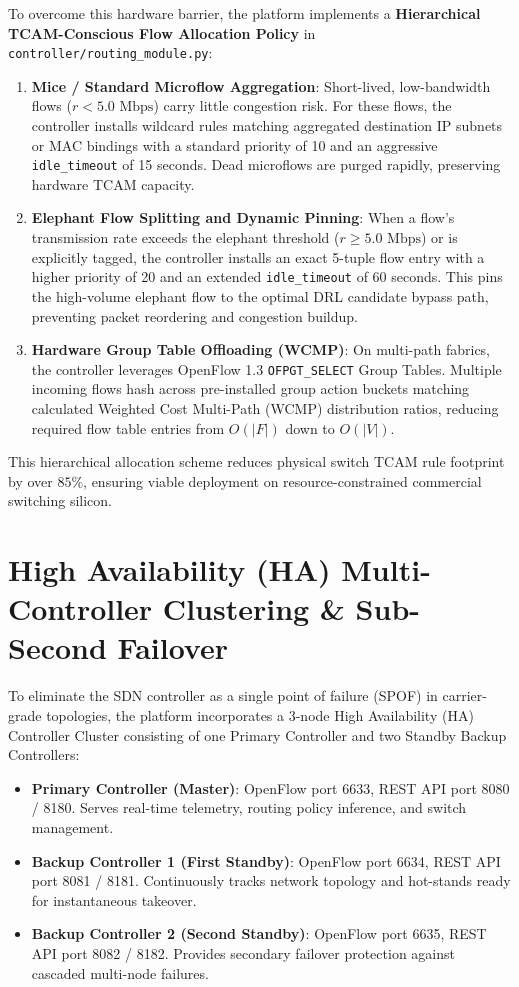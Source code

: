 \documentclass[12pt,a4paper,oneside]{report}
\begin{document}
To overcome this hardware barrier, the platform implements a \textbf{Hierarchical TCAM-Conscious Flow Allocation Policy} in \texttt{controller/routing\_module.py}:
\begin{enumerate}
    \item \textbf{Mice / Standard Microflow Aggregation}: Short-lived, low-bandwidth flows ($r < 5.0\text{ Mbps}$) carry little congestion risk. For these flows, the controller installs wildcard rules matching aggregated destination IP subnets or MAC bindings with a standard priority of 10 and an aggressive \texttt{idle\_timeout} of 15 seconds. Dead microflows are purged rapidly, preserving hardware TCAM capacity.
    \item \textbf{Elephant Flow Splitting and Dynamic Pinning}: When a flow's transmission rate exceeds the elephant threshold ($r \ge 5.0\text{ Mbps}$) or is explicitly tagged, the controller installs an exact 5-tuple flow entry with a higher priority of 20 and an extended \texttt{idle\_timeout} of 60 seconds. This pins the high-volume elephant flow to the optimal DRL candidate bypass path, preventing packet reordering and congestion buildup.
    \item \textbf{Hardware Group Table Offloading (WCMP)}: On multi-path fabrics, the controller leverages OpenFlow 1.3 \texttt{OFPGT\_SELECT} Group Tables. Multiple incoming flows hash across pre-installed group action buckets matching calculated Weighted Cost Multi-Path (WCMP) distribution ratios, reducing required flow table entries from $O(|F|)$ down to $O(|V|)$.
\end{enumerate}
This hierarchical allocation scheme reduces physical switch TCAM rule footprint by over $85\%$, ensuring viable deployment on resource-constrained commercial switching silicon.

\section{High Availability (HA) Multi-Controller Clustering \& Sub-Second Failover}
\label{sec:ha_controller_clustering}
To eliminate the SDN controller as a single point of failure (SPOF) in carrier-grade topologies, the platform incorporates a 3-node High Availability (HA) Controller Cluster consisting of one Primary Controller and two Standby Backup Controllers:
\begin{itemize}
    \item \textbf{Primary Controller (Master)}: OpenFlow port 6633, REST API port 8080 / 8180. Serves real-time telemetry, routing policy inference, and switch management.
    \item \textbf{Backup Controller 1 (First Standby)}: OpenFlow port 6634, REST API port 8081 / 8181. Continuously tracks network topology and hot-stands ready for instantaneous takeover.
    \item \textbf{Backup Controller 2 (Second Standby)}: OpenFlow port 6635, REST API port 8082 / 8182. Provides secondary failover protection against cascaded multi-node failures.
\end{itemize}
\end{document}
